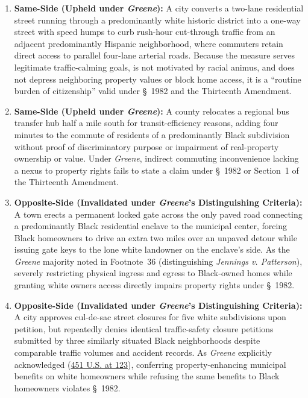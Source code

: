 \documentclass[12pt]{article}
\begin{document}
\begin{enumerate}
  \item \textbf{Same-Side (Upheld under \textit{Greene}):} A city converts a two-lane residential street running through a predominantly white historic district into a one-way street with speed humps to curb rush-hour cut-through traffic from an adjacent predominantly Hispanic neighborhood, where commuters retain direct access to parallel four-lane arterial roads. Because the measure serves legitimate traffic-calming goals, is not motivated by racial animus, and does not depress neighboring property values or block home access, it is a ``routine burden of citizenship'' valid under \S~1982 and the Thirteenth Amendment.
  \item \textbf{Same-Side (Upheld under \textit{Greene}):} A county relocates a regional bus transfer hub half a mile south for transit-efficiency reasons, adding four minutes to the commute of residents of a predominantly Black subdivision without proof of discriminatory purpose or impairment of real-property ownership or value. Under \textit{Greene}, indirect commuting inconvenience lacking a nexus to property rights fails to state a claim under \S~1982 or Section~1 of the Thirteenth Amendment.
  \item \textbf{Opposite-Side (Invalidated under \textit{Greene}'s Distinguishing Criteria):} A town erects a permanent locked gate across the only paved road connecting a predominantly Black residential enclave to the municipal center, forcing Black homeowners to drive an extra two miles over an unpaved detour while issuing gate keys to the lone white landowner on the enclave's side. As the \textit{Greene} majority noted in Footnote~36 (distinguishing \textit{Jennings v. Patterson}), severely restricting physical ingress and egress to Black-owned homes while granting white owners access directly impairs property rights under \S~1982.
  \item \textbf{Opposite-Side (Invalidated under \textit{Greene}'s Distinguishing Criteria):} A city approves cul-de-sac street closures for five white subdivisions upon petition, but repeatedly denies identical traffic-safety closure petitions submitted by three similarly situated Black neighborhoods despite comparable traffic volumes and accident records. As \textit{Greene} explicitly acknowledged (\href{https://supreme.justia.com/cases/federal/us/451/100/}{451 U.S. at 123}), conferring property-enhancing municipal benefits on white homeowners while refusing the same benefits to Black homeowners violates \S~1982.

\end{enumerate}
\end{document}
